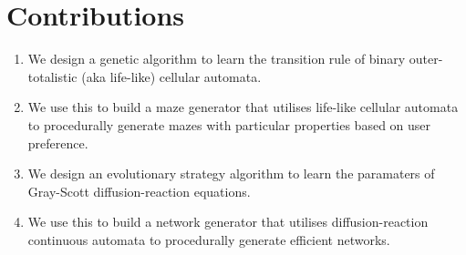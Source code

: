 \section{Contributions}

\begin{enumerate}
    \item We design a genetic algorithm to learn the transition rule of binary outer-totalistic (aka life-like) cellular automata.
    \item We use this to build a maze generator that utilises life-like cellular automata to procedurally generate mazes with particular properties based on user preference.
    \item We design an evolutionary strategy algorithm to learn the paramaters of Gray-Scott diffusion-reaction equations.
    \item We use this to build a network generator that utilises diffusion-reaction continuous automata to procedurally generate efficient networks.
\end{enumerate}